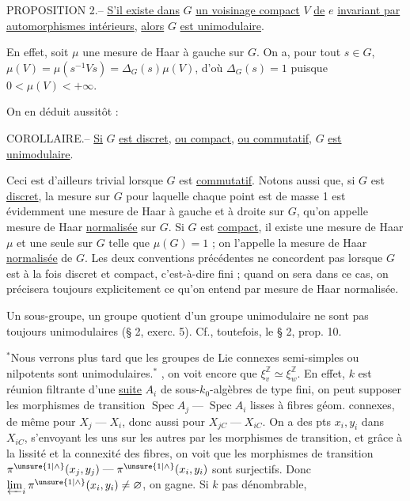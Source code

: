 PROPOSITION 2.-- \uline{S'il existe dans} $G$ \uline{un voisinage compact} $V$ \uline{de} $e$ \uline{invariant par
automorphismes intérieurs}, \uline{alors} $G$ \uline{est unimodulaire}.

En effet, soit $\mu$ une mesure de Haar à gauche sur $G$. On a, pour tout $s\in G$,
$\mu(V)=\mu(s^{-1}Vs)=\Delta_G(s)\mu(V)$, d'où $\Delta_G(s)=1$ puisque $0<\mu(V)<+\infty$.

On en déduit aussitôt :

COROLLAIRE.-- \uline{Si} $G$ \uline{est discret}, \uline{ou compact}, \uline{ou commutatif}, $G$ \uline{est unimodulaire}.

Ceci est d'ailleurs trivial lorsque $G$ est \uline{commutatif}. Notons aussi que, si
$G$ est \uline{discret}, la mesure sur $G$ pour laquelle chaque point est de masse 1 est
évidemment une mesure de Haar à gauche et à droite sur $G$, qu'on appelle mesure
de Haar \uline{normalisée} sur $G$. Si $G$ est \uline{compact}, il existe une mesure de Haar $\mu$ et
une seule sur $G$ telle que $\mu(G)=1$ ; on l'appelle la mesure de Haar \uline{normalisée}
de $G$. Les deux conventions précédentes ne concordent pas lorsque $G$ est à la
fois discret et compact, c'est-à-dire fini ; quand on sera dans ce cas, on
précisera toujours explicitement ce qu'on entend par mesure de Haar normalisée.

Un sous-groupe, un groupe quotient d'un groupe unimodulaire ne sont pas
toujours unimodulaires (§ 2, exerc. 5). Cf., toutefois, le § 2, prop. 10.

$^{*}$Nous verrons plus tard que les groupes de Lie connexes semi-simples ou
nilpotents sont unimodulaires.$^{*}$
, on voit encore que
$\xi_v^{\mathbb Z}\simeq\xi_w^{\mathbb Z}$. En effet, $k$ est réunion filtrante
d'une \uline{suite} $A_i$ de sous-$k_0$-algèbres de type
fini, on peut supposer les morphismes
de transition $\operatorname{Spec}A_j\mathrel{\text{---}}\operatorname{Spec}A_i$
lisses à fibres géom. connexes, de même
pour $X_j\mathrel{\text{---}}X_i$, donc aussi pour $X_{jC}\mathrel{\text{---}}X_{iC}$.
On a des pts $x_i,y_i$ dans $X_{iC}$, s'envoyant
les uns sur les autres par les
morphismes de transition, et grâce à
la lissité et la connexité des fibres,
on voit que les morphismes de
transition $\pi^{\unsure{1|\wedge}}(x_j,y_j)\mathrel{\text{---}}\pi^{\unsure{1|\wedge}}(x_i,y_i)$ sont
surjectifs. Donc $\varprojlim_i\pi^{\unsure{1|\wedge}}(x_i,y_i)\ne\varnothing$,
on gagne.
Si $k$ pas dénombrable,

